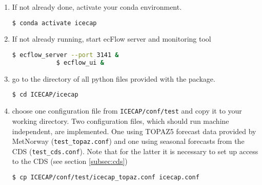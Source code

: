 \documentclass[DIV=10, parskip=full]{scrreprt}
\begin{document}
\begin{enumerate}
	\item If not already done, activate your conda environment.
	\begin{lstlisting}[language=bash]
		$ conda activate icecap 
	\end{lstlisting}
	
	\item If not already running, start ecFlow server and monitoring tool 
		\begin{lstlisting}[language=bash]
			$ ecflow_server --port 3141 &
			$ ecflow_ui & 
		\end{lstlisting}

		
	\item go to the directory of all python files provided with the package.
	\begin{lstlisting}[language=bash]
		$ cd ICECAP/icecap
	\end{lstlisting}
	
	\item choose one configuration file from \texttt{ICECAP/conf/test} and copy it to your working directory. Two configuration files, which should run machine independent, are implemented. One using TOPAZ5 forecast data provided by MetNorway (\texttt{test\_topaz.conf}) and one using seasonal forecasts from the CDS (\texttt{test\_cds.conf}). Note that for the latter it is necessary to set up access to the CDS (see section \ref{subsec:cds})\\
	\begin{lstlisting}[language=bash]
		$ cp ICECAP/conf/test/icecap_topaz.conf icecap.conf
	\end{lstlisting}
	

\end{enumerate}
\end{document}
